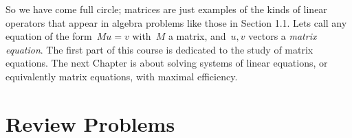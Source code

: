 
So we have come full circle; matrices are just examples of the kinds of linear operators that appear in algebra problems like those in 
Section 1.1. 
Lets call any equation of the form~$Mu=v$ with~$M$ a matrix, and~$u,v$ vectors a {\it matrix equation}. The first part of this course is dedicated to the study of matrix equations. 
The next Chapter is about solving systems of linear equations, or equivalently matrix equations, with maximal efficiency.

%
%








\section{Review Problems}


\newpage